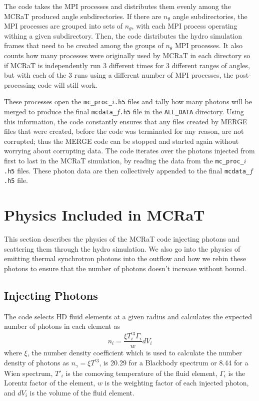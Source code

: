 \documentclass[12pt,a4paper]{article}
\begin{document}
The code takes the MPI processes and distributes them evenly among the MCRaT produced angle subdirectories. If there are $n_\theta$ angle subdirectories, the MPI processes are grouped into sets of $n_\theta$, with each MPI process operating withing a given subdirectory. Then, the code distributes the hydro simulation frames that need to be created among the groups of $n_\theta$ MPI processes. It also counts how many processes were originally used by MCRaT in each directory so if MCRaT is independently run 3 different times for 3 different ranges of angles, but with each of the 3 runs using a different number of MPI processes, the post-processing code will still work.

These processes open the \texttt{mc\_proc\_$i$.h5} files and tally how many photons will be merged to produce the final \texttt{mcdata\_$f$.h5} file in the \texttt{ALL\_DATA} directory. Using this information, the code constantly ensures that any files created by MERGE files that were created, before the code was terminated for any reason, are not corrupted; thus the MERGE code can be stopped and started again without worrying about corrupting data. The code iterates over the photons injected from first to last in the MCRaT simulation, by reading the data from the \texttt{mc\_proc\_$i$.h5} files. These photon data are then collectively appended to the final \texttt{mcdata\_$f$.h5} file. 

\section{Physics Included in MCRaT}
This section describes the physics of the MCRaT code injecting photons and scattering them through the hydro simulation. We also go into the physics of emitting thermal synchrotron photons into the outflow and how we rebin these photons to ensure that the number of photons doesn't increase without bound.

\subsection{Injecting Photons} \label{inj}
The code selects HD fluid elements at a given radius and calculates the expected number of photons in each element as
\begin{equation} \label{n_density}
n_i=\frac{\xi T_i^{'3}\Gamma_i}{w}dV_i 
\end{equation} 
where $\xi$, the number density coefficient which is used to calculate the number density of photons as $n_\gamma=\xi T^{'3}$, is 20.29 for a Blackbody spectrum or 8.44 for a Wien spectrum, $T'_i$ is the comoving temperature of the fluid element, $\Gamma_i$ is the Lorentz factor of the element, $w$ is the weighting factor of each injected photon, and $dV_i$ is the volume of the fluid element. 
 
\end{document}
